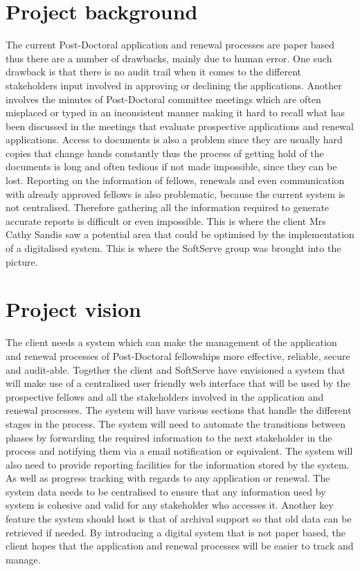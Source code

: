 \documentclass[12pt]{article}
\begin{document}
\section{Project background}
\vspace{0.2in}
The current Post-Doctoral application and renewal processes are paper based thus there are a number of drawbacks, mainly due to human error. One such drawback is that there is no audit trail when it comes to the different stakeholders input involved in approving or declining the applications. Another involves the minutes of Post-Doctoral committee meetings which are often misplaced or typed in an inconsistent manner making it hard to recall what has been discussed in the meetings that evaluate prospective applications and renewal applications. Access to documents is also a problem since they are usually hard copies that change hands constantly thus the process of getting hold of the documents is long and often tedious if not made impossible, since they can be lost. Reporting on the information of fellows, renewals and even communication with already approved fellows is also problematic, because the current system is not centralised. Therefore gathering all the information required to generate accurate reports is difficult or even impossible. This is where the client Mrs Cathy Sandis saw a potential area that could be optimised by the implementation of a digitalised system. This is where the SoftServe group was brought into the picture.
\vspace{0.5in}

\newpage
\section{Project vision}
\vspace{0.2in}
The client needs a system which can make the management of the application and renewal processes of Post-Doctoral fellowships more effective, reliable, secure and audit-able. Together the client and SoftServe have envisioned a system that will make use of a centralised user friendly web interface that will be used by the prospective fellows and all the stakeholders involved in the application and renewal processes. The system will have various sections that handle the different stages in the process. The system will need to automate the transitions between phases by forwarding the required information to the next stakeholder in the process and notifying them via a email notification or equivalent. The system will also need to provide reporting facilities for the information stored by the system. As well as progress tracking with regards to any application or renewal. The system data needs to be centralised to ensure that any information used by system is cohesive and valid for any stakeholder who accesses it. Another key feature the system should host is that of archival support so that old data can be retrieved if needed. By introducing a digital system that is not paper based, the client hopes that the application and renewal processes will be easier to track and manage.
\vspace{0.5in}
\end{document}

